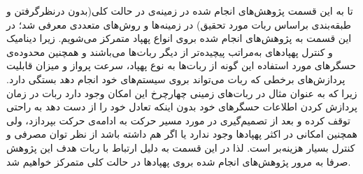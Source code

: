تا به این قسمت پژوهش‌های انجام شده در زمینه‌ی  در حالت کلی(بدون درنظرگرفتن و طبقه‌بندی براساس ربات مورد تحقیق) در زمینه‌ها و روش‌های متعددی معرفی شد؛ در این قسمت به پژوهش‌های انجام شده بروی انواع پهپاد متمرکز می‌شویم. زیرا دینامیک و کنترل پهپادهای به‌مراتب پیچیده‌تر از دیگر ربات‌ها می‌باشند و همچنین محدوده‌ی حسگرهای مورد استفاده این گونه از ربات‌ها به نوع پهپاد، سرعت پرواز و میزان قابلیت پردازش‌های برخطی که ربات می‌تواند بروی سیستم‌های خود انجام دهد بستگی دارد. زیرا که به عنوان مثال در ربات‌های زمینی چهارچرخ این امکان وجود دارد ربات در زمان پردازش کردن اطلاعات حسگرهای خود بدون اینکه تعادل خود را از دست دهد به راحتی توقف کرده و بعد از تصمیم‌گیری در مورد مسیر حرکت به ادامه‌ی حرکت بپردازد، ولی همچنین امکانی در اکثر پهپادها وجود ندارد یا اگر هم داشته باشد از نظر توان مصرفی و کنترل بسیار هزینه‌بر است. لذا در این قسمت به دلیل ارتباط با ربات هدف این پژوهش صرفا به مرور پژوهش‌های انجام شده بروی پهپادها در حالت کلی متمرکز خواهیم شد.